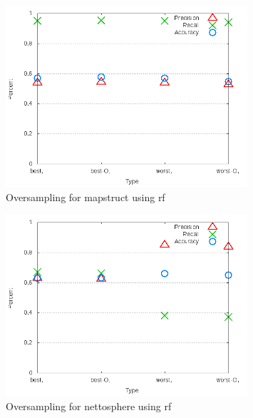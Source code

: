 \begin{figure}[!t]
\centering
\includegraphics[width=0.8\textwidth]{images/rf/test_4/mapstruct_sample_range.png}
\caption{Oversampling for mapstruct using \gls{rf}}
\label{fig:test_4_mapstruct_rf}
\end{figure}

\begin{figure}[!t]
\centering
\includegraphics[width=0.8\textwidth]{images/rf/test_4/nettosphere_sample_range.png}
\caption{Oversampling for nettosphere using \gls{rf}}
\label{fig:test_4_nettosphere_rf}
\end{figure}

